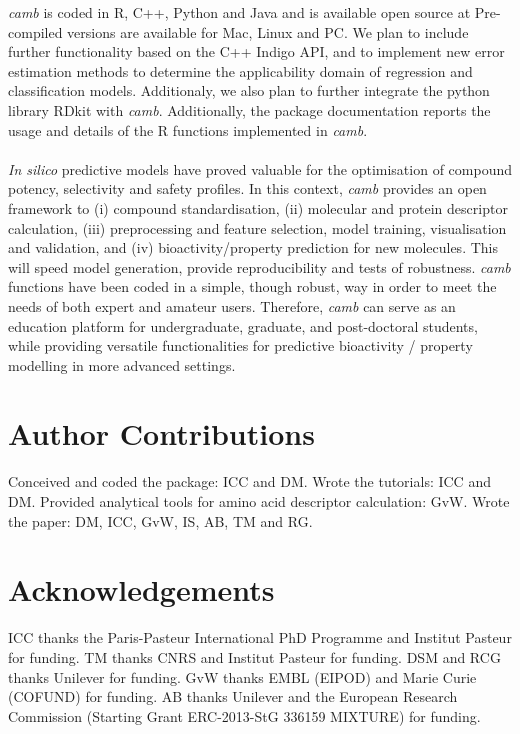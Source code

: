 \documentclass[twoside,a4wide,10pt]{article}
\begin{document}
{\it camb} is coded in R, C++, Python and Java and is available open source
at %
Pre-compiled versions are available for Mac, Linux and PC.
We plan to include further functionality based on the C++ Indigo API,
and to implement new error estimation methods to determine the applicability domain of
regression and classification models.
Additionaly, we also plan to further integrate the python library RDkit with {\it camb}.
Additionally, the package documentation reports the usage and details of the R functions implemented in {\it camb}.\\
\\
{\it In silico} predictive models have proved valuable
for the optimisation of compound potency, selectivity and safety profiles.
In this context, {\it camb} provides an open framework
to (i) compound standardisation, (ii) molecular and protein descriptor calculation,
(iii) preprocessing and feature selection, model training, visualisation and validation, and 
(iv) bioactivity/property prediction for new molecules.
This will speed model generation, provide reproducibility and tests of robustness.
{\it camb} functions have been coded in a simple, though robust, way
in order to meet the needs of both expert and amateur users. 
Therefore, {\it camb} can serve as an education platform for 
undergraduate, graduate, and post-doctoral students,
while providing versatile functionalities for predictive bioactivity / property modelling
in more advanced settings.






\section*{{\bf Author Contributions}}

Conceived and coded the package: ICC and DM.
Wrote the tutorials: ICC and DM.
Provided analytical tools for amino acid descriptor calculation: GvW.
Wrote the paper: DM, ICC, GvW, IS, AB, TM and RG.

\section*{{\bf Acknowledgements}}
ICC thanks the Paris-Pasteur International PhD Programme and Institut Pasteur for funding.
TM thanks CNRS and Institut Pasteur for funding.
DSM and RCG thanks Unilever for funding.
GvW thanks EMBL (EIPOD) and Marie Curie (COFUND) for funding.
AB thanks Unilever and the European Research Commission (Starting Grant ERC-2013-StG 336159 MIXTURE) for funding.
\end{document}
